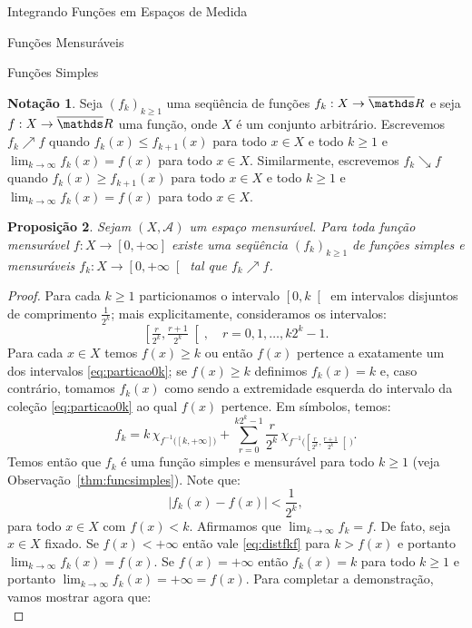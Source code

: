\documentclass[oneside,final,11pt]{amsbook}
\newcommand{\R}{\mathds R}
\theoremstyle{remark}\newtheorem{exercise}{Exercício}[chapter]
\theoremstyle{remark}\newtheorem{*exercise}[exercise]{\hbox to 0pt{\hskip 0pt minus 1fil*}Exercício}
\theoremstyle{definition}\newtheorem{exdefin}{Definição}[chapter]
\theoremstyle{plain}\newtheorem{teo}{Teorema}[section]
\theoremstyle{plain}\newtheorem{lem}[teo]{Lema}
\theoremstyle{plain}\newtheorem{prop}[teo]{Proposição}
\theoremstyle{plain}\newtheorem{cor}[teo]{Corolário}
\theoremstyle{definition}\newtheorem{defin}[teo]{Definição}
\theoremstyle{remark}\newtheorem{rem}[teo]{Observação}
\theoremstyle{definition}\newtheorem{notation}[teo]{Notação}
\theoremstyle{definition}\newtheorem{convention}[teo]{Convenção}
\theoremstyle{definition}\newtheorem{example}[teo]{Exemplo}
\numberwithin{section}{chapter}
\numberwithin{equation}{section}
\begin{document}
\begin{chapter}{Integrando Funções em Espaços de Medida}
\begin{section}{Funções Mensuráveis}
\begin{subsection}{Funções Simples}
\begin{notation}
Seja $(f_k)_{k\ge1}$ uma seqüência de funções $f_k:X\to\overline\R$
e seja $f:X\to\overline\R$ uma função, onde $X$ é um conjunto arbitrário. Escrevemos $f_k\nearrow f$ quando
$f_k(x)\le f_{k+1}(x)$ para todo $x\in X$ e todo $k\ge1$ e $\lim_{k\to\infty}f_k(x)=f(x)$
para todo $x\in X$. Similarmente,
escrevemos $f_k\searrow f$ quando $f_k(x)\ge f_{k+1}(x)$
para todo $x\in X$ e todo $k\ge1$ e $\lim_{k\to\infty}f_k(x)=f(x)$ para todo $x\in X$.
\end{notation}

\begin{prop}\label{thm:aproxmonotsimples}
Sejam $(X,\mathcal A)$ um espaço mensurável. Para toda função mensurável $f:X\to[0,+\infty]$
existe uma seqüência $(f_k)_{k\ge1}$
de funções simples e mensuráveis $f_k:X\to\left[0,+\infty\right[$ tal que $f_k\nearrow f$.
\end{prop}
\begin{proof}
Para cada $k\ge1$ particionamos o intervalo $\left[0,k\right[$ em intervalos disjuntos
de comprimento $\frac1{2^k}$; mais explicitamente, consideramos os intervalos:
\begin{equation}\label{eq:particao0k}
\left[\tfrac r{2^k},\tfrac{r+1}{2^k}\right[,\quad r=0,1,\ldots,k2^k-1.
\end{equation}
Para cada $x\in X$ temos $f(x)\ge k$ ou então $f(x)$ pertence a exatamente um dos intervalos
\eqref{eq:particao0k}; se $f(x)\ge k$ definimos $f_k(x)=k$ e, caso contrário,
tomamos $f_k(x)$ como sendo a extremidade esquerda do intervalo da coleção \eqref{eq:particao0k}
ao qual $f(x)$ pertence. Em símbolos, temos:
\[f_k=k\,\chi_{f^{-1}\big([k,+\infty]\big)}+
\sum_{r=0}^{k2^k-1}\frac r{2^k}\,\chi_{f^{-1}\big(\left[\tfrac r{2^k},\tfrac{r+1}{2^k}\right[\big)}.\]
Temos então que $f_k$ é uma função simples e mensurável para todo $k\ge1$ (veja Observação~\ref{thm:funcsimples}). Note que:
\begin{equation}\label{eq:distfkf}
\big\vert f_k(x)-f(x)\big\vert<\frac1{2^k},
\end{equation}
para todo $x\in X$ com $f(x)<k$. Afirmamos que $\lim_{k\to\infty}f_k=f$. De fato, seja $x\in X$ fixado.
Se $f(x)<+\infty$ então vale \eqref{eq:distfkf} para $k>f(x)$ e portanto $\lim_{k\to\infty}f_k(x)=f(x)$.
Se $f(x)=+\infty$ então $f_k(x)=k$ para todo $k\ge1$ e portanto $\lim_{k\to\infty}f_k(x)=+\infty=f(x)$.
Para completar a demonstração, vamos mostrar agora que:
\begin{equation}\label{eq:fkcresce}

\end{equation}
\end{proof}
\end{subsection}
\end{section}
\end{chapter}
\end{document}
